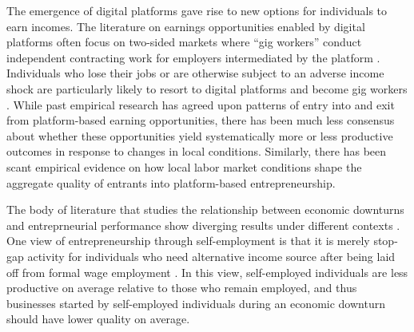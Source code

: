 \documentclass[letterpaper,12pt]{article}
\begin{document}


The emergence of digital platforms gave rise to new options for individuals to earn incomes. The literature on earnings opportunities enabled by digital platforms often focus on two-sided markets where ``gig workers'' conduct independent contracting work for employers intermediated by the platform \citep{abraham_measuring_2017,collins_is_2019,katz_understanding_2019,abraham_what_2022}. Individuals who lose their jobs or are otherwise subject to an adverse income shock are particularly likely to resort to digital platforms and become gig workers \citep{garin_is_2020,huang_unemployment_2020,laitenberger2023unemployment,jackson_availability_2022}. While past empirical research has agreed upon patterns of entry into and exit from platform-based earning opportunities, there has been much less consensus about whether these opportunities yield systematically more or less productive outcomes in response to changes in local conditions. Similarly, there has been scant empirical evidence on how local labor market conditions shape the aggregate quality of entrants into platform-based entrepreneurship.

The body of literature that studies the relationship between economic downturns and entreprneurial performance show diverging results under different contexts \citep{conti2021lowering,hacamo_forced_2022,steffens2023asymmetric}. One view of entrepreneurship through self-employment is that it is merely stop-gap activity for individuals who need alternative income source after being laid off from formal wage employment \citep{evans_small_1990,kaiser_is_2011}. In this view, self-employed individuals are less productive on average relative to those who remain employed, and thus businesses started by self-employed individuals during an economic downturn should have lower quality on average.
\end{document}
